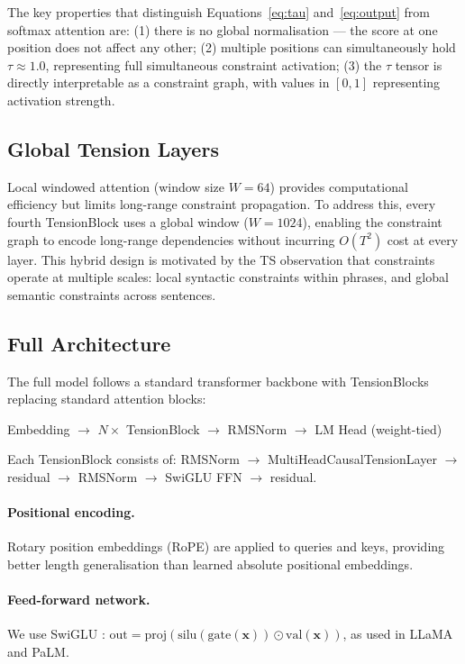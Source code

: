\documentclass[10pt,a4paper]{article}
\begin{document}
The key properties that distinguish Equations~\ref{eq:tau} and~\ref{eq:output} from softmax attention are: (1) there is no global normalisation --- the score at one position does not affect any other; (2) multiple positions can simultaneously hold $\tau \approx 1.0$, representing full simultaneous constraint activation; (3) the $\tau$ tensor is directly interpretable as a constraint graph, with values in $[0, 1]$ representing activation strength.

\subsection{Global Tension Layers}

Local windowed attention (window size $W = 64$) provides computational efficiency but limits long-range constraint propagation. To address this, every fourth TensionBlock uses a global window ($W = 1024$), enabling the constraint graph to encode long-range dependencies without incurring $O(T^2)$ cost at every layer. This hybrid design is motivated by the TS observation that constraints operate at multiple scales: local syntactic constraints within phrases, and global semantic constraints across sentences.

\subsection{Full Architecture}

The full model follows a standard transformer backbone with TensionBlocks replacing standard attention blocks:

\begin{center}
    Embedding $\rightarrow$ $N \times$ TensionBlock $\rightarrow$ RMSNorm $\rightarrow$ LM Head (weight-tied)
\end{center}

Each TensionBlock consists of: RMSNorm $\rightarrow$ MultiHeadCausalTensionLayer $\rightarrow$ residual $\rightarrow$ RMSNorm $\rightarrow$ SwiGLU FFN $\rightarrow$ residual.

\paragraph{Positional encoding.} Rotary position embeddings (RoPE) \cite{su2021roformer} are applied to queries and keys, providing better length generalisation than learned absolute positional embeddings.

\paragraph{Feed-forward network.} We use SwiGLU \cite{shazeer2020glu}: $\text{out} = \text{proj}(\text{silu}(\text{gate}(\mathbf{x})) \odot \text{val}(\mathbf{x}))$, as used in LLaMA and PaLM.
\end{document}
